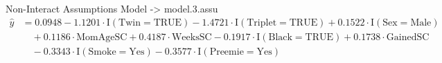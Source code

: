 \documentclass{article}\usepackage[]{graphicx}\usepackage[]{xcolor}
\begin{document}
Non-Interact Assumptions Model -> model.3.assu
\begin{align*}
\hat{y} &= 0.0948 - 1.1201\cdot \text{I}(\text{Twin} = \text{TRUE}) - 1.4721\cdot \text{I}(\text{Triplet} = \text{TRUE}) + 0.1522\cdot \text{I}(\text{Sex} = \text{Male}) \\
&\quad + 0.1186\cdot \text{MomAgeSC} + 0.4187\cdot \text{WeeksSC} - 0.1917\cdot \text{I}(\text{Black} = \text{TRUE}) + 0.1738\cdot \text{GainedSC} \\
&\quad - 0.3343\cdot \text{I}(\text{Smoke} = \text{Yes}) - 0.3577\cdot \text{I}(\text{Preemie} = \text{Yes})
\end{align*}
\end{document}
